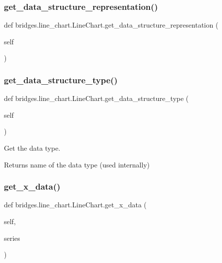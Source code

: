 \subsubsection{\texorpdfstring{get\_data\_structure\_representation()}{get\_data\_structure\_representation()}}
{\footnotesize\ttfamily def bridges.\+line\+\_\+chart.\+Line\+Chart.\+get\+\_\+data\+\_\+structure\+\_\+representation (\begin{DoxyParamCaption}\item[{}]{self }\end{DoxyParamCaption})}

\mbox{\label{classbridges_1_1line__chart_1_1_line_chart_a8124cb8693d6564a64264747d6ca5021}} 
\subsubsection{\texorpdfstring{get\_data\_structure\_type()}{get\_data\_structure\_type()}}
{\footnotesize\ttfamily def bridges.\+line\+\_\+chart.\+Line\+Chart.\+get\+\_\+data\+\_\+structure\+\_\+type (\begin{DoxyParamCaption}\item[{}]{self }\end{DoxyParamCaption})}



Get the data type. 

\begin{DoxyReturn}{Returns}
name of the data type (used internally) 
\end{DoxyReturn}
\mbox{\label{classbridges_1_1line__chart_1_1_line_chart_af1f00a86504734b3f1a8209c66052422}} 
\subsubsection{\texorpdfstring{get\_x\_data()}{get\_x\_data()}}
{\footnotesize\ttfamily def bridges.\+line\+\_\+chart.\+Line\+Chart.\+get\+\_\+x\+\_\+data (\begin{DoxyParamCaption}\item[{}]{self,  }\item[{}]{series }\end{DoxyParamCaption})}



